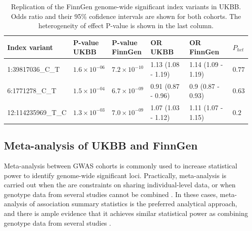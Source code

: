   \begin{table}[H]
    \centering\begingroup\fontsize{10}{12}\selectfont
    \caption{Replication of the FinnGen genome-wide significant index variants in UKBB. Odds ratio and their 95\% cofidence intervals are shown for both cohorts. The heterogeneity of effect P-value is shown in the last column.}
    \label{table:replication_finngen_in_ukbb}
    \begin{tabular}[t]{llllll}
    \toprule
    Index variant & \makecell{P-value\\ UKBB} & \makecell{P-value\\ FinnGen} & \makecell{OR\\ UKBB} & \makecell{OR\\ FinnGen} & $P_{het}$\\
    \midrule
    1:39817036\_C\_T & $1.6\times10^{-06}$ & $7.2\times10^{-10}$ & 1.13 (1.08 - 1.19) & 1.14 (1.09 - 1.19) & $0.77$\\
    6:1771278\_C\_T & $1.5\times10^{-04}$ & $6.7\times10^{-09}$ & 0.91 (0.87 - 0.96) & 0.9 (0.87 - 0.93) & $0.63$\\
    12:114235969\_T\_C & $1.3\times10^{-03}$ & $7.0\times10^{-09}$ & 1.07 (1.03 - 1.12) & 1.11 (1.07 - 1.15) & $0.2$\\
    \bottomrule
    \end{tabular}
    \endgroup{}
    \end{table}


    \subsection{Meta-analysis of UKBB and FinnGen}
    Meta-analysis between GWAS cohorts is commonly used to increase statistical power to identify genome-wide significant loci. Practically, meta-analysis is carried out when the are constraints on sharing individual-level data, or when genotype data from several studies cannot be combined \cite{Evangelou2013-rn}. In these cases, meta-analysis of association summary statistics is the preferred analytical approach, and there is ample evidence that it achieves similar statistical power as combining genotype data from several studies \cite{metal_docs}. \\




